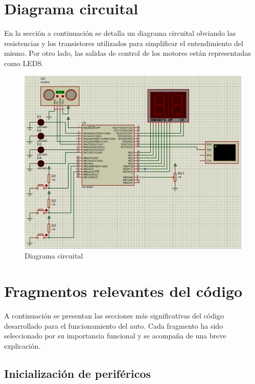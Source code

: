 \documentclass[]{article}
\begin{document}
	\section{Diagrama circuital}
	En la sección a continuación se detalla un diagrama circuital obviando las resistencias y los transistores utilizados para simplificar el entendimiento del mismo. Por otro lado, las salidas de control de los motores están representadas como LEDS.
	\begin{figure}[h!]
		\centering
		\includegraphics[width=0.7\linewidth]{Figuras/diagrama_circuital}
		\caption{Diagrama circuital}
		\label{fig:diagramacircuital}
	\end{figure}
	
	\section{Fragmentos relevantes del código}
	
	A continuación se presentan las secciones más significativas del código desarrollado para el funcionamiento del auto. Cada fragmento ha sido seleccionado por su importancia funcional y se acompaña de una breve explicación.
	
	\newpage
	\thispagestyle{fancy}
	
	\subsection{Inicialización de periféricos}
	
\end{document}
